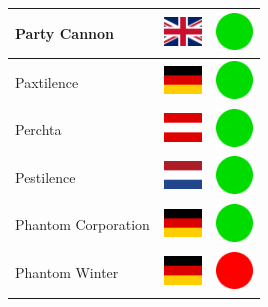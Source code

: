 \documentclass[12pt, a4paper, twoside]{report}
\begin{document}
\begin{center}
\begin{longtable}{|p{5cm}|p{2cm}|p{2cm}|}
Party Cannon & \includegraphics[width=1cm]{4x3/gb} & \includegraphics[width=1cm]{likes/y} \\ \hline
Paxtilence & \includegraphics[width=1cm]{4x3/de} & \includegraphics[width=1cm]{likes/y} \\ \hline
Perchta & \includegraphics[width=1cm]{4x3/at} & \includegraphics[width=1cm]{likes/y} \\ \hline
Pestilence & \includegraphics[width=1cm]{4x3/nl} & \includegraphics[width=1cm]{likes/y} \\ \hline
Phantom Corporation & \includegraphics[width=1cm]{4x3/de} & \includegraphics[width=1cm]{likes/y} \\ \hline
Phantom Winter & \includegraphics[width=1cm]{4x3/de} & \includegraphics[width=1cm]{likes/n} \\ \hline

\end{longtable}
\end{center}
\end{document}
